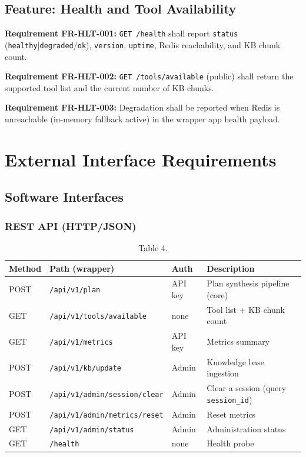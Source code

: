 \documentclass[10pt,journal,onecolumn]{IEEEtran}
\newcommand{\reqid}[1]{\textbf{#1}}
\begin{document}
\subsection{Feature: Health and Tool Availability}

\reqid{Requirement FR-HLT-001:} \texttt{GET /health} shall report \texttt{status} (\texttt{healthy}|\texttt{degraded}/\texttt{ok}), \texttt{version}, \texttt{uptime}, Redis reachability, and KB chunk count.

\reqid{Requirement FR-HLT-002:} \texttt{GET /tools/available} (public) shall return the supported tool list and the current number of KB chunks.

\reqid{Requirement FR-HLT-003:} Degradation shall be reported when Redis is unreachable (in-memory fallback active) in the wrapper app health payload.

\section{External Interface Requirements}

\subsection{Software Interfaces}

\subsubsection{REST API (HTTP/JSON)}

\begin{table}[h]
\caption{Table 4.}
\label{tab:t4}
\begin{tabularx}{\columnwidth}{l >{\raggedright\arraybackslash}X >{\raggedright\arraybackslash}X >{\raggedright\arraybackslash}X}
\toprule
\textbf{Method} & \textbf{Path (wrapper)} & \textbf{Auth} & \textbf{Description}\\
\midrule
POST & \texttt{/api/v1/plan} & API key & Plan synthesis pipeline (core)\\
GET & \texttt{/api/v1/tools/available} & none & Tool list + KB chunk count\\
GET & \texttt{/api/v1/metrics} & API key & Metrics summary\\
POST & \texttt{/api/v1/kb/update} & Admin & Knowledge base ingestion\\
POST & \texttt{/\allowbreak api/\allowbreak v1/\allowbreak admin/\allowbreak session/\allowbreak clear} & Admin & Clear a session (query \texttt{session\_id})\\
POST & \texttt{/\allowbreak api/\allowbreak v1/\allowbreak admin/\allowbreak metrics/\allowbreak reset} & Admin & Reset metrics\\
GET & \texttt{/api/v1/admin/status} & Admin & Administration status\\
GET & \texttt{/health} & none & Health probe\\
\bottomrule
\end{tabularx}
\end{table}
\end{document}
